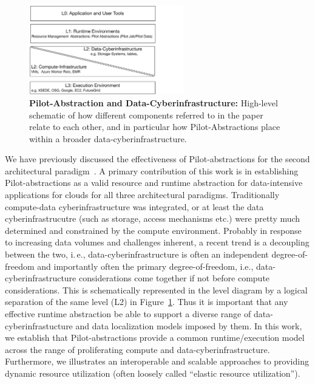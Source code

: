 \documentclass[times]{cpeauth}
\newcommand{\pilot}{Pilot\xspace}
\begin{document}
\begin{figure}[t] 
\centering
\includegraphics[width=0.6\textwidth]{figures/data-intensive-arch.pdf}
\caption{\textbf{\pilot-Abstraction and Data-Cyberinfrastructure:} High-level schematic of how different components referred to
  in the paper relate to each other, and in particular how
  \pilot-Abstractions place within a broader data-cyberinfrastructure.}
\label{fig:figures_arch}
\end{figure}

We have previously discussed the effectiveness of Pilot-abstractions
for the second architectural paradigm~\cite{pstar12}.  A primary contribution
of this work is in establishing \pilot-abstractions as a valid
resource and runtime abstraction for data-intensive applications for
clouds for all three architectural paradigms.  Traditionally
compute-data cyberinfrastructure was integrated, or at least the data
cyberinfrastrucutre (such as storage, access mechanisms etc.)  were
pretty much determined and constrained by the compute environment.
Probably in response to increasing data volumes and challenges
inherent, a recent trend is a decoupling between the two, i.\,e.,
data-cyberinfrastructure is often an independent degree-of-freedom and
importantly often the primary degree-of-freedom, i.e.,
data-cyberinfrastructure considerations come together if not before
compute considerations.  This is schematically represented in the
level diagram by a logical separation of the same level (L2) in
Figure~\ref{fig:figures_arch}.  Thus it is important that any
effective runtime abstraction be able to support a diverse range of
data-cyberinfrastucture and data localization models imposed by them.
In this work, we establish that \pilot-abstractions provide a common
runtime/execution model across the range of proliferating compute and
data-cyberinfrastructure.  Furthermore, we illustrates an
interoperable and scalable approaches to providing dynamic resource
utilization (often loosely called ``elastic resource utilization'').
\end{document}
